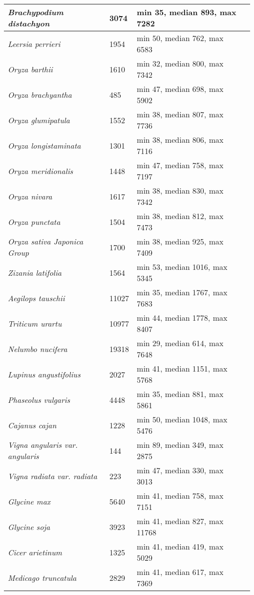 {\begin{longtable}{| L{4cm} | L{2cm}  | L{5cm} | L{4cm} |}
\textit{Brachypodium distachyon} & 3074 & min 35, median 893, max 7282 & \\ \hline
\textit{Leersia perrieri} & 1954 & min 50, median 762, max 6583 & \\ \hline
\textit{Oryza barthii} & 1610 & min 32, median 800, max 7342 & \\ \hline
\textit{Oryza brachyantha} & 485 & min 47, median 698, max 5902 & \\ \hline
\textit{Oryza glumipatula} & 1552 & min 38, median 807, max 7736 & \\ \hline
\textit{Oryza longistaminata}& 1301 & min 38, median 806, max 7116 & \\ \hline
\textit{Oryza meridionalis} & 1448 & min 47, median 758, max 7197 & \\ \hline
\textit{Oryza nivara} & 1617 & min 38, median 830, max 7342 & \\ \hline
\textit{Oryza punctata} & 1504 & min 38, median 812, max 7473 & \\ \hline
\textit{Oryza sativa Japonica Group} & 1700 & min 38, median 925, max 7409 & \\ \hline
\textit{Zizania latifolia} & 1564 & min 53, median 1016, max 5345 & \\ \hline
\textit{Aegilops tauschii} & 11027 & min 35, median 1767, max 7683 & \\ \hline
\textit{Triticum urartu} & 10977 & min 44, median 1778, max 8407 & \\ \hline
\textit{Nelumbo nucifera} & 19318 & min 29, median 614, max 7648 & \\ \hline
\textit{Lupinus angustifolius} & 2027 & min 41, median 1151, max 5768 & \\ \hline
\textit{Phaseolus vulgaris} & 4448 & min 35, median 881, max 5861 & \\ \hline
\textit{Cajanus cajan} & 1228 & min 50, median 1048, max 5476 & \\ \hline
\textit{Vigna angularis var. angularis} & 144 & min 89, median 349, max 2875 & \\ \hline
\textit{Vigna radiata var. radiata} & 223 & min 47, median 330, max 3013 & \\ \hline
\textit{Glycine max} & 5640 & min 41, median 758, max 7151 & \\ \hline
\textit{Glycine soja} & 3923 & min 41, median 827, max 11768 & \\ \hline
\textit{Cicer arietinum} & 1325 & min 41, median 419, max 5029 & \\ \hline
\textit{Medicago truncatula} & 2829 & min 41, median 617, max 7369 & \\ \hline

\end{longtable}}
